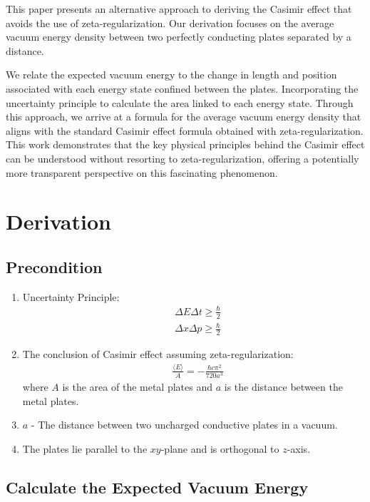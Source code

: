 \documentclass[aip,apl,amsmath,amssymb,reprint]{revtex4-2}
\begin{document}
This paper presents an alternative approach to deriving the Casimir effect that avoids the use of zeta-regularization. 
Our derivation focuses on the average vacuum energy density between two perfectly conducting plates separated by a distance. 

We relate the expected vacuum energy to the change in length and position associated with each energy state confined between the plates. 
Incorporating the uncertainty principle to calculate the area linked to each energy state.
Through this approach, we arrive at a formula for the average vacuum energy density 
that aligns with the standard Casimir effect formula obtained with zeta-regularization. 
This work demonstrates that the key physical principles behind the Casimir effect can be understood without resorting to zeta-regularization, 
offering a potentially more transparent perspective on this fascinating phenomenon.


\section{Derivation}


\subsection*{Precondition}
\begin{enumerate}
    \item Uncertainty Principle\citep*{heisenberg1930physical}:
    \begin{align}
        &\Delta E \Delta t \ge \frac{\hbar}{2}\\
        &\Delta x \Delta p \ge \frac{\hbar}{2}
    \end{align}
    \item The conclusion of Casimir effect assuming zeta-regularization\citep*{Casimir:1948dh}: 
    \begin{align}&\frac{\langle E \rangle}{A} = -\frac{\hbar c \pi^2}{720 a^3}\end{align}
    where \(A\) is the area of the metal plates and $a$ is the distance between the metal plates.
    \item $a$ - The distance between two uncharged conductive plates in a vacuum.
    \item The plates lie parallel to the \(xy\)-plane and is orthogonal to \(z\)-axis.
\end{enumerate}

\subsection*{Calculate the Expected Vacuum Energy}
\end{document}
